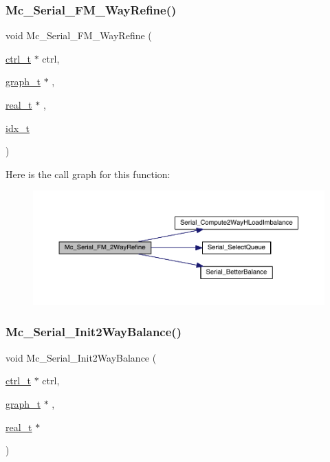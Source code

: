 \subsubsection{\texorpdfstring{Mc\+\_\+\+Serial\+\_\+\+F\+M\+\_\+Way\+Refine()}{Mc\_Serial\_FM\_2WayRefine()}}
{\footnotesize\ttfamily void Mc\+\_\+\+Serial\+\_\+\+F\+M\+\_\+Way\+Refine (\begin{DoxyParamCaption}\item[{\hyperlink{a00742}{ctrl\+\_\+t} $\ast$}]{ctrl,  }\item[{\hyperlink{a00734}{graph\+\_\+t} $\ast$}]{,  }\item[{\hyperlink{a00876_a1924a4f6907cc3833213aba1f07fcbe9}{real\+\_\+t} $\ast$}]{,  }\item[{\hyperlink{a00876_aaa5262be3e700770163401acb0150f52}{idx\+\_\+t}}]{ }\end{DoxyParamCaption})}

Here is the call graph for this function\+:\nopagebreak
\begin{figure}[H]
\begin{center}
\leavevmode
\includegraphics[width=350pt]{a00951_a42818724bbd4f57e98e56314032ce836_cgraph}
\end{center}
\end{figure}
\mbox{\label{a00951_ae397fc4e64666390e696046f73e4e8e7}} 
\subsubsection{\texorpdfstring{Mc\+\_\+\+Serial\+\_\+\+Init2\+Way\+Balance()}{Mc\_Serial\_Init2WayBalance()}}
{\footnotesize\ttfamily void Mc\+\_\+\+Serial\+\_\+\+Init2\+Way\+Balance (\begin{DoxyParamCaption}\item[{\hyperlink{a00742}{ctrl\+\_\+t} $\ast$}]{ctrl,  }\item[{\hyperlink{a00734}{graph\+\_\+t} $\ast$}]{,  }\item[{\hyperlink{a00876_a1924a4f6907cc3833213aba1f07fcbe9}{real\+\_\+t} $\ast$}]{ }\end{DoxyParamCaption})}

